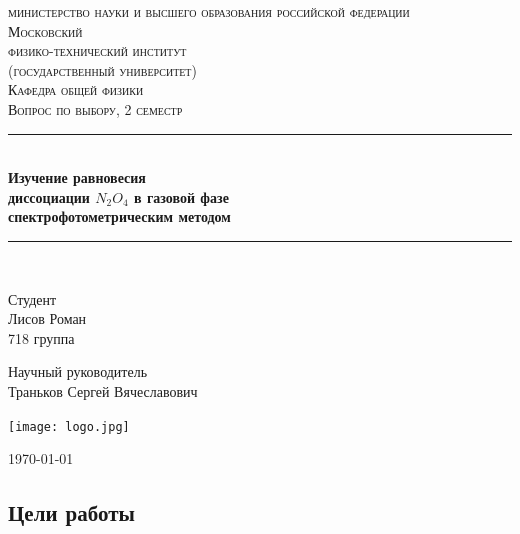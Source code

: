 \documentclass[a4paper,12pt]{article} %
\newenvironment{bottompar}{\par\vspace*{\fill}}{\clearpage}
\begin{document}


\begin{titlepage}
\newcommand{\HRule}{\rule{\linewidth}{0.5mm}} %

\center %
 
\textsc{\LARGE министерство науки и высшего образования российской федерации\\[0.1cm]
\Large Московский\\[-0.2cm]физико-технический институт\\[0.1cm]\large (государственный университет)}\\[1.5cm] %
\textsc{\Large Кафедра общей физики}\\[0.2cm] %
\textsc{\large Вопрос по выбору, 2 семестр}\\[0.5cm] %

\HRule
\\[0.1cm]
{ \large \bfseries Изучение равновесия 
\\[0.0cm] диссоциации  \(N_2O_4\) в газовой фазе \\[0.1cm] спектрофотометрическим методом} %
\HRule
\\[1.5cm]

\begin{flushleft} \large
	\textsf{Студент}\\[0.1cm]
	Лисов Роман \\
	718 группа
	
	\textsf{Научный руководитель}\\[0.1cm]
	Траньков Сергей Вячеславович	
	
\end{flushleft}


\begin{bottompar}
	\begin{center}
		\texttt{[image: logo.jpg]}
	\end{center}
	{\large \today}

\end{bottompar}
\vfill
\end{titlepage}


\newpage
\setcounter{page}{2}

\subsection*{Цели работы}
\end{document}
